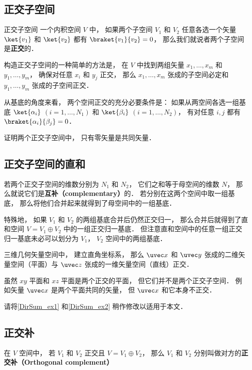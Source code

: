 
\subsection{正交子空间}

\begin{definition}{正交子空间}
一个内积空间 $V$ 中， 如果两个子空间 $V_1$ 和 $V_2$ 任意各选一个矢量 $\ket{v_1}$ 和 $\ket{v_2}$ 都有 $\braket{v_1}{v_2} = 0$， 那么我们就说者两个子空间是\textbf{正交}的．
\end{definition}

构造正交子空间的一种简单的方法是， 在 $V$ 中找到两组矢量 $x_1, \dots, x_m$ 和 $y_1, \dots, y_m$， 确保对任意 $x_i$ 和 $y_j$ 正交， 那么 $x_1, \dots, x_m$ 张成的子空间必定和 $y_1, \dots, y_m$ 张成的子空间正交．%

\begin{theorem}{}
从基底的角度来看， 两个空间正交的充分必要条件是： 如果从两空间各选一组基底 $\ket{\alpha_i}$ $(i = 1, \dots, N_1)$ 和 $\ket{\beta_i}$ $(i = 1, \dots, N_2)$， 有对任意 $i, j$ 都有 $\braket{\alpha_i}{\beta_j} = 0$．
\end{theorem}

\begin{exercise}{}
证明两个正交子空间中， 只有零矢量是共同矢量．
\end{exercise}

\subsection{正交子空间的直和}

若两个正交子空间的维数分别为 $N_1$ 和 $N_2$， 它们之和等于母空间的维数 $N$， 那么就说它们是\textbf{互补（complementary）}的． 若分别在这两个空间中取一组基底， 那么将他们合并起来就得到了母空间中的一组基底．

特殊地， 如果 $V_1$ 和 $V_2$ 的两组基底合并后仍然正交归一， 那么合并后就得到了直和空间 $V = V_1 \oplus V_2$ 中的一组正交归一基底． 但注意直和空间中的任意一组正交归一基底未必可以划分为 $V_1$， $V_2$ 空间中的两组基底．

\begin{example}{}
三维几何矢量空间中， 建立直角坐标系， 那么 $\uvec x$ 和 $\uvec y$ 张成的二维矢量空间（平面）与 $\uvec z$ 张成的一维矢量空间（直线）正交．
\end{example}

\begin{example}{}
虽然 $xy$ 平面和 $xz$ 平面是两个正交的平面， 但它们并不是两个正交子空间． 例如矢量 $\uvec x$ 是两个平面共同的矢量， 但 $\uvec x$ 和它本身不正交．
\end{example}

\begin{exercise}{}
请将\autoref{DirSum_ex1} 和\autoref{DirSum_ex2} 稍作修改以适用于本文．
\end{exercise}

\subsection{正交补}
在 $V$ 空间中， 若 $V_1$ 和 $V_2$ 正交且 $V = V_1 \oplus V_2$， 那么 $V_1$ 和 $V_2$ 分别叫做对方的\textbf{正交补（Orthogonal complement）}